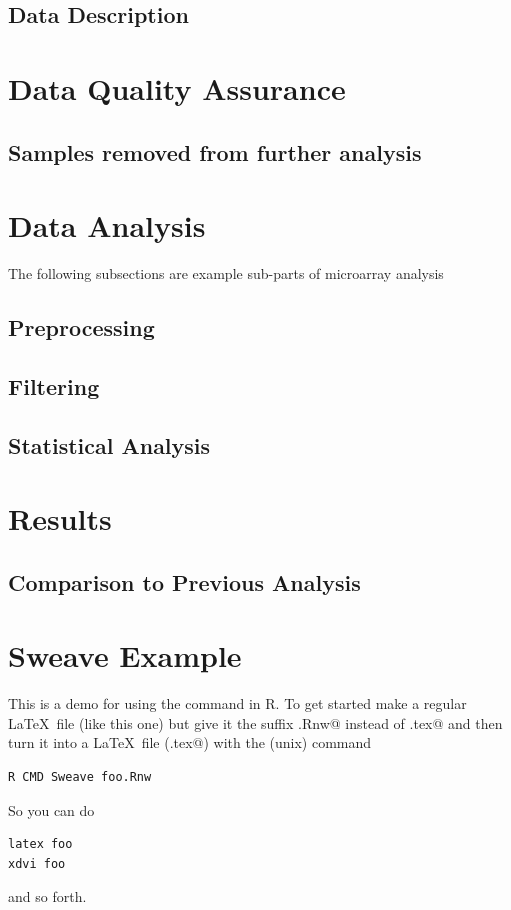 \documentclass[12pt]{article}
\begin{document}
\subsection{Data Description}


\section{Data Quality Assurance}

\subsection{Samples removed from further analysis}

\section{Data Analysis}

The following subsections are example sub-parts of microarray analysis

\subsection{Preprocessing}
\subsection{Filtering}
\subsection{Statistical Analysis}

\section{Results}

\subsection{Comparison to Previous Analysis}


\section{Sweave Example}
This is a demo for using the \verb@Sweave@ command in R.  To
get started make a regular \LaTeX\ file (like this one) but
give it the suffix \verb@.Rnw@ instead of \verb@.tex@ and then
turn it into a \LaTeX\ file (\verb@foo.tex@) with the (unix) command
\begin{verbatim}
R CMD Sweave foo.Rnw
\end{verbatim}
So you can do
\begin{verbatim}
latex foo
xdvi foo
\end{verbatim}
and so forth.
\end{document}
